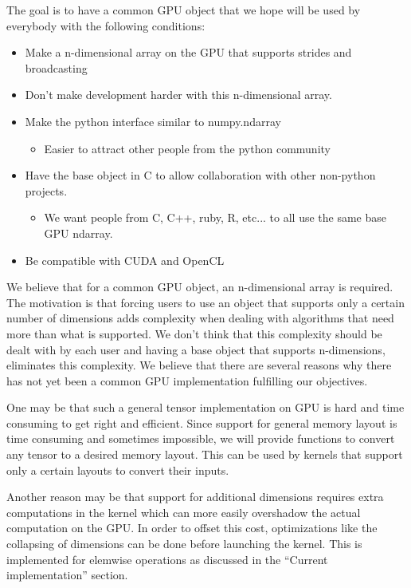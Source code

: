 \documentclass{article} %
\begin{document}
The goal is to have a common GPU object that we hope will be used by everybody with the following conditions:

\begin{itemize}
\item Make a n-dimensional array on the GPU that supports strides and broadcasting
\item Don't make development harder with this n-dimensional array. 
\item Make the python interface similar to numpy.ndarray
  \begin{itemize}
  \item Easier to attract other people from the python community
  \end{itemize}
\item Have the base object in C to allow collaboration with other non-python projects.
  \begin{itemize}
  \item We want people from C, C++, ruby, R, etc... to all use the same base GPU ndarray.
  \end{itemize}
\item Be compatible with CUDA and OpenCL
\end{itemize}

We believe that for a common GPU object, an n-dimensional array is required.
The motivation is that forcing users to use an object that supports only a certain number of dimensions adds complexity when dealing with algorithms that need more than what is supported.
We don't think that this complexity should be dealt with by each user and having a base object that supports n-dimensions, eliminates this complexity.
We believe that there are several reasons why there has not yet been a common GPU implementation fulfilling our objectives.

One may be that such a general tensor implementation on GPU is hard and time consuming to get right and efficient.
Since support for general memory layout is time consuming and sometimes impossible, we will provide functions to convert any tensor to a desired memory layout.  This can be used by kernels that support only a certain layouts to convert their inputs.

Another reason may be that support for additional dimensions requires extra computations in the kernel which can more easily overshadow the actual computation on the GPU.
In order to offset this cost, optimizations like the collapsing of dimensions can be done before launching the kernel.  
This is implemented for elemwise operations as discussed in the ``Current implementation'' section.
\end{document}

